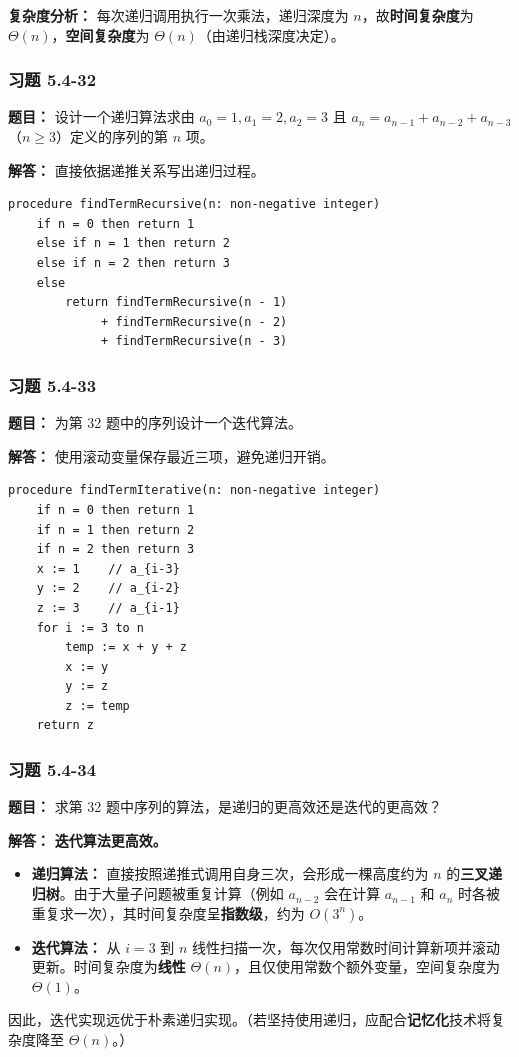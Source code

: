\documentclass[11pt,UTF8]{article}
\begin{document}
\textbf{复杂度分析：} 每次递归调用执行一次乘法，递归深度为 $n$，故\textbf{时间复杂度}为 $\Theta(n)$，\textbf{空间复杂度}为 $\Theta(n)$（由递归栈深度决定）。

\subsubsection*{习题 5.4-32}
\textbf{题目：} 设计一个递归算法求由 $a_0=1, a_1=2, a_2=3$ 且 $a_n = a_{n-1} + a_{n-2} + a_{n-3}$（$n \ge 3$）定义的序列的第 $n$ 项。

\textbf{解答：} 直接依据递推关系写出递归过程。

\begin{verbatim}
procedure findTermRecursive(n: non-negative integer)
    if n = 0 then return 1
    else if n = 1 then return 2
    else if n = 2 then return 3
    else
        return findTermRecursive(n - 1) 
             + findTermRecursive(n - 2) 
             + findTermRecursive(n - 3)
\end{verbatim}

\subsubsection*{习题 5.4-33}
\textbf{题目：} 为第 32 题中的序列设计一个迭代算法。

\textbf{解答：} 使用滚动变量保存最近三项，避免递归开销。

\begin{verbatim}
procedure findTermIterative(n: non-negative integer)
    if n = 0 then return 1
    if n = 1 then return 2
    if n = 2 then return 3
    x := 1    // a_{i-3}
    y := 2    // a_{i-2}
    z := 3    // a_{i-1}
    for i := 3 to n
        temp := x + y + z
        x := y
        y := z
        z := temp
    return z
\end{verbatim}

\subsubsection*{习题 5.4-34}
\textbf{题目：} 求第 32 题中序列的算法，是递归的更高效还是迭代的更高效？

\textbf{解答：} \textbf{迭代算法更高效。}

\begin{itemize}
    \item \textbf{递归算法：} 直接按照递推式调用自身三次，会形成一棵高度约为 $n$ 的\textbf{三叉递归树}。由于大量子问题被重复计算（例如 $a_{n-2}$ 会在计算 $a_{n-1}$ 和 $a_n$ 时各被重复求一次），其时间复杂度呈\textbf{指数级}，约为 $O(3^n)$。
    \item \textbf{迭代算法：} 从 $i=3$ 到 $n$ 线性扫描一次，每次仅用常数时间计算新项并滚动更新。时间复杂度为\textbf{线性} $\Theta(n)$，且仅使用常数个额外变量，空间复杂度为 $\Theta(1)$。
\end{itemize}
因此，迭代实现远优于朴素递归实现。（若坚持使用递归，应配合\textbf{记忆化}技术将复杂度降至 $\Theta(n)$。）
\end{document}
